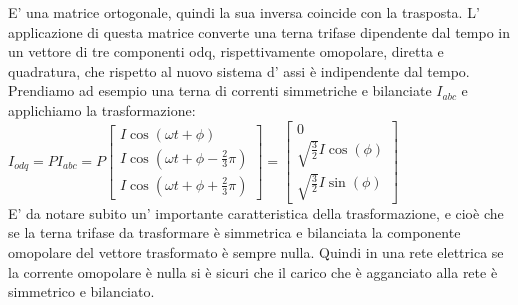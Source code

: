 \documentclass[Lau,noexaminfo]{sapthesis}
\begin{document}
	E' una matrice ortogonale, quindi la sua inversa coincide con la trasposta.
	L' applicazione di questa matrice converte una terna trifase dipendente dal tempo in un vettore di tre componenti odq, rispettivamente omopolare, diretta e quadratura, che rispetto al nuovo sistema d' assi è indipendente dal tempo.\\
	Prendiamo ad esempio una terna di correnti simmetriche e bilanciate $I_{abc}$ e applichiamo la trasformazione:\\
	$I_{odq}=P I_{abc}=P \begin{bmatrix}
	I\cos(\omega t + \phi)\\
	I\cos(\omega t + \phi -\frac{2}{3}\pi) \\
	I\cos(\omega t + \phi +\frac{2}{3}\pi)
	\end{bmatrix}=
	\begin{bmatrix}
	0 \\
	\sqrt{\frac{3}{2}}I\cos(\phi)\\
	\sqrt{\frac{3}{2}}I\sin(\phi)
	\end{bmatrix}
	$\\
	E' da notare subito un' importante caratteristica della trasformazione, e cioè che se la terna trifase da trasformare è simmetrica e bilanciata la componente omopolare del vettore trasformato è sempre nulla. Quindi in una rete elettrica se la corrente omopolare è nulla si è sicuri che il carico che è agganciato alla rete è simmetrico e bilanciato.\newpage
\end{document}
